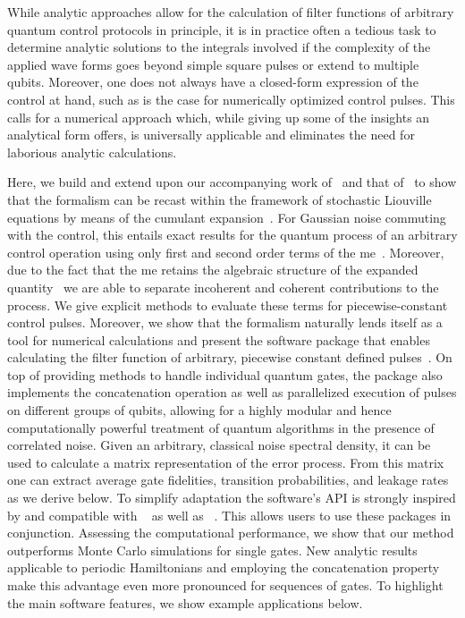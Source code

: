 While analytic approaches allow for the calculation of filter functions of arbitrary quantum control protocols in principle, it is in practice often a tedious task to determine analytic solutions to the integrals involved if the complexity of the applied wave forms goes beyond simple square pulses or extend to multiple qubits.
Moreover, one does not always have a closed-form expression of the control at hand, such as is the case for numerically optimized control pulses.
This calls for a numerical approach which, while giving up some of the insights an analytical form offers, is universally applicable and eliminates the need for laborious analytic calculations.

Here, we build and extend upon our accompanying work of~ and that of~ to show that the formalism can be recast within the framework of stochastic Liouville equations by means of the cumulant expansion~\cite{Kubo1962,Kubo1963,Fox1976,Bianucci2020}.
For Gaussian noise commuting with the control, this entails exact results for the quantum process of an arbitrary control operation using only first and second order terms of the \gls{me}~\cite{Magnus1954}.
Moreover, due to the fact that the \gls{me} retains the algebraic structure of the expanded quantity~\cite{Blanes2009} we are able to separate incoherent and coherent contributions to the process.
We give explicit methods to evaluate these terms for piecewise-constant control pulses.
Moreover, we show that the formalism naturally lends itself as a tool for numerical calculations and present the \filterfunctions \python software package that enables calculating the filter function of arbitrary, piecewise constant defined pulses~\cite{Hangleiter_ff}.
On top of providing methods to handle individual quantum gates, the package also implements the concatenation operation as well as parallelized execution of pulses on different groups of qubits, allowing for a highly modular and hence computationally powerful treatment of quantum algorithms in the presence of correlated noise.
Given an arbitrary, classical noise spectral density, it can be used to calculate a matrix representation of the error process.
From this matrix one can extract average gate fidelities, transition probabilities, and leakage rates as we derive below.
To simplify adaptation the software's API is strongly inspired by and compatible with \qutip~\cite{Johansson2013} as well as \qopt~\cite{Teske2021,Teske2022}.
This allows users to use these packages in conjunction.
Assessing the computational performance, we show that our method outperforms Monte Carlo simulations for single gates.
New analytic results applicable to periodic Hamiltonians and employing the concatenation property make this advantage even more pronounced for sequences of gates.
To highlight the main software features, we show example applications below.

